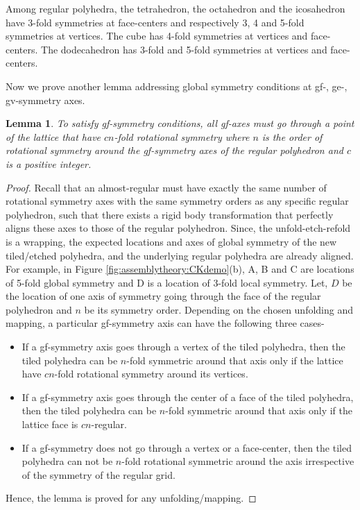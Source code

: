 \documentclass[11pt]{article}
\newtheorem{lemma}[thm]{Lemma}
\newcommand{\1}{\mathds{1}}
\begin{document}
Among regular polyhedra, the tetrahedron, the octahedron and the icosahedron have 3-fold symmetries at face-centers and respectively 3, 4 and 5-fold symmetries at vertices. The cube has 4-fold symmetries at vertices and face-centers. The dodecahedron has 3-fold and 5-fold symmetries at vertices and face-centers. 

Now we prove another lemma addressing global symmetry conditions at gf-, ge-, gv-symmetry axes.


\begin{lemma}
\label{lemma:assemblytheory:localglobal}
 To satisfy gf-symmetry conditions, all gf-axes must go through a point of the lattice that have $cn$-fold rotational symmetry where $n$ is the order of rotational symmetry around the gf-symmetry axes of the regular polyhedron and $c$ is a positive integer.
\end{lemma}

\begin{proof}
 Recall that an almost-regular must have exactly the same number of rotational symmetry axes with the same symmetry orders as any specific regular polyhedron, such that there exists a rigid body transformation that perfectly aligns these axes to those of the regular polyhedron. Since, the unfold-etch-refold is a wrapping, the expected locations and axes of global symmetry of the new tiled/etched polyhedra, and the underlying regular polyhedra are already aligned. For example, in Figure \ref{fig:assemblytheory:CKdemo}(b), A, B and C are locations of 5-fold global symmetry and D is a location of 3-fold local symmetry. Let, $D$ be the location of one axis of symmetry going through the face of the regular polyhedron and $n$ be its symmetry order. Depending on the chosen unfolding and mapping, a particular gf-symmetry axis can have the following three cases-

 \begin{itemize}
  \item If a gf-symmetry axis goes through a vertex of the tiled polyhedra, then the tiled polyhedra can be $n$-fold symmetric around that axis only if the lattice have $cn$-fold rotational symmetry around its vertices.
  \item If a gf-symmetry axis goes through the center of a face of the tiled polyhedra, then the tiled polyhedra can be $n$-fold symmetric around that axis only if the lattice face is $cn$-regular.
  \item If a gf-symmetry does not go through a vertex or a face-center, then the tiled polyhedra can not be $n$-fold rotational symmetric around the axis irrespective of the symmetry of the regular grid. 
 \end{itemize}

 Hence, the lemma is proved for any unfolding/mapping.
\end{proof} 
\end{document}

